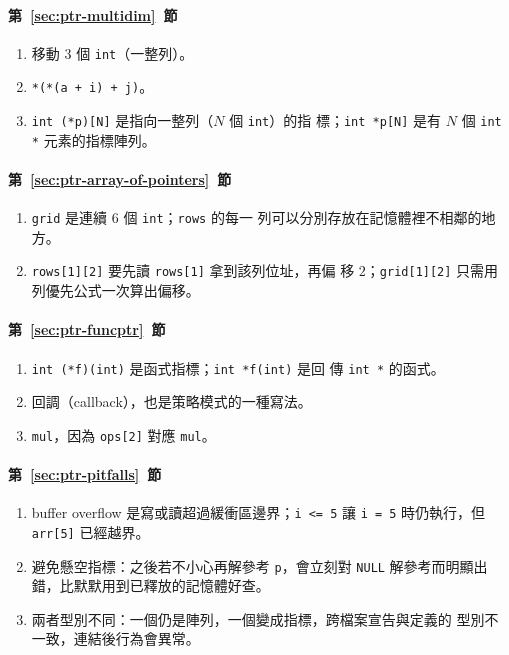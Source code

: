 \paragraph{第~\ref{sec:ptr-multidim}~節}
\begin{enumerate}
\item 移動 $3$ 個 \texttt{int}（一整列）。
\item \texttt{*(*(a + i) + j)}。
\item \texttt{int (*p)[N]} 是指向一整列（$N$ 個 \texttt{int}）的指
標；\texttt{int *p[N]} 是有 $N$ 個 \texttt{int *} 元素的指標陣列。
\end{enumerate}

\paragraph{第~\ref{sec:ptr-array-of-pointers}~節}
\begin{enumerate}
\item \texttt{grid} 是連續 $6$ 個 \texttt{int}；\texttt{rows} 的每一
列可以分別存放在記憶體裡不相鄰的地方。
\item \texttt{rows[1][2]} 要先讀 \texttt{rows[1]} 拿到該列位址，再偏
移 $2$；\texttt{grid[1][2]} 只需用列優先公式一次算出偏移。
\end{enumerate}

\paragraph{第~\ref{sec:ptr-funcptr}~節}
\begin{enumerate}
\item \texttt{int (*f)(int)} 是函式指標；\texttt{int *f(int)} 是回
傳 \texttt{int *} 的函式。
\item 回調（callback），也是策略模式的一種寫法。
\item \texttt{mul}，因為 \texttt{ops[2]} 對應 \texttt{mul}。
\end{enumerate}

\paragraph{第~\ref{sec:ptr-pitfalls}~節}
\begin{enumerate}
\item buffer overflow 是寫或讀超過緩衝區邊界；\texttt{i <= 5} 讓
\texttt{i = 5} 時仍執行，但 \texttt{arr[5]} 已經越界。
\item 避免懸空指標：之後若不小心再解參考 \texttt{p}，會立刻對
\texttt{NULL} 解參考而明顯出錯，比默默用到已釋放的記憶體好查。
\item 兩者型別不同：一個仍是陣列，一個變成指標，跨檔案宣告與定義的
型別不一致，連結後行為會異常。
\end{enumerate}
